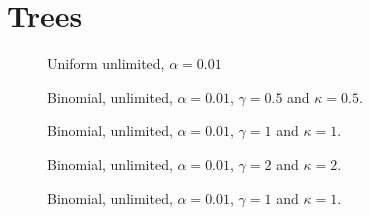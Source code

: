 \section{Trees}
%
%
%




\begin{figure}
    \centering
    \scalebox{0.5}{}
    \caption{Uniform unlimited, $\alpha = 0.01$}
    \label{unif_unlim_a0.01}
\end{figure}

\begin{figure}
    \centering
    \begin{minipage}[t]{0.45\textwidth} 
        \centering
        \scalebox{0.6}{}
        \caption{Binomial, unlimited, $\alpha = 0.01$, $\gamma=0.5$ and $\kappa=0.5$.}
        \label{binom_unlim_a0.01_g0.5_k0.5}
    \end{minipage}
    \hfill
    \centering
    \begin{minipage}[t]{0.45\textwidth} 
        \centering
        \scalebox{0.6}{}
        \caption{Binomial, unlimited, $\alpha = 0.01$, $\gamma=1$ and $\kappa=1$.}
        \label{binom_unlim_a0.01_g1_k1}
    \end{minipage}
\end{figure}

\begin{figure}
    \centering
    \begin{minipage}[t]{0.45\textwidth} 
        \centering
        \scalebox{0.6}{}
        \caption{Binomial, unlimited, $\alpha = 0.01$, $\gamma=2$ and $\kappa=2$.}
        \label{binom_unlim_a0.01_g2_k2}
    \end{minipage}
    \hfill
    \centering
    \begin{minipage}[t]{0.45\textwidth} 
        \centering
        \scalebox{0.6}{}
        \caption{Binomial, unlimited, $\alpha = 0.01$, $\gamma=1$ and $\kappa=1$.}
        \label{binom_unlim_a0.01_g1_k1}
    \end{minipage}
\end{figure}